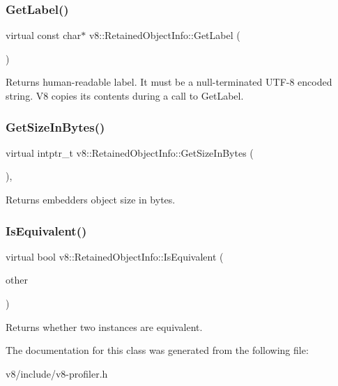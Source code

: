 \subsubsection{\texorpdfstring{Get\+Label()}{GetLabel()}}
{\footnotesize\ttfamily virtual const char$\ast$ v8\+::\+Retained\+Object\+Info\+::\+Get\+Label (\begin{DoxyParamCaption}{ }\end{DoxyParamCaption})\hspace{0.3cm}{\ttfamily [pure virtual]}}

Returns human-\/readable label. It must be a null-\/terminated U\+T\+F-\/8 encoded string. V8 copies its contents during a call to Get\+Label. \mbox{\label{classv8_1_1RetainedObjectInfo_a1a899eed0b1f6e046edc3c7a7c08aa8c}} 
\subsubsection{\texorpdfstring{Get\+Size\+In\+Bytes()}{GetSizeInBytes()}}
{\footnotesize\ttfamily virtual intptr\+\_\+t v8\+::\+Retained\+Object\+Info\+::\+Get\+Size\+In\+Bytes (\begin{DoxyParamCaption}{ }\end{DoxyParamCaption})\hspace{0.3cm}{\ttfamily [inline]}, {\ttfamily [virtual]}}

Returns embedder\textquotesingle{}s object size in bytes. \mbox{\label{classv8_1_1RetainedObjectInfo_a286103bb076c85415919c86b1838c990}} 
\subsubsection{\texorpdfstring{Is\+Equivalent()}{IsEquivalent()}}
{\footnotesize\ttfamily virtual bool v8\+::\+Retained\+Object\+Info\+::\+Is\+Equivalent (\begin{DoxyParamCaption}\item[{\mbox{\hyperlink{classv8_1_1RetainedObjectInfo}{Retained\+Object\+Info}} $\ast$}]{other }\end{DoxyParamCaption})\hspace{0.3cm}{\ttfamily [pure virtual]}}

Returns whether two instances are equivalent. 

The documentation for this class was generated from the following file\+:\begin{DoxyCompactItemize}
\item 
v8/include/v8-\/profiler.\+h\end{DoxyCompactItemize}
